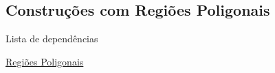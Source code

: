 \subsection{Construções com Regiões Poligonais}
\label{construcoes-regiao-poligonal-prop}
\begin{titlemize}{Lista de dependências}
	\item \hyperref[regiao-poligonal-def]{Regiões Poligonais}%
\end{titlemize}

